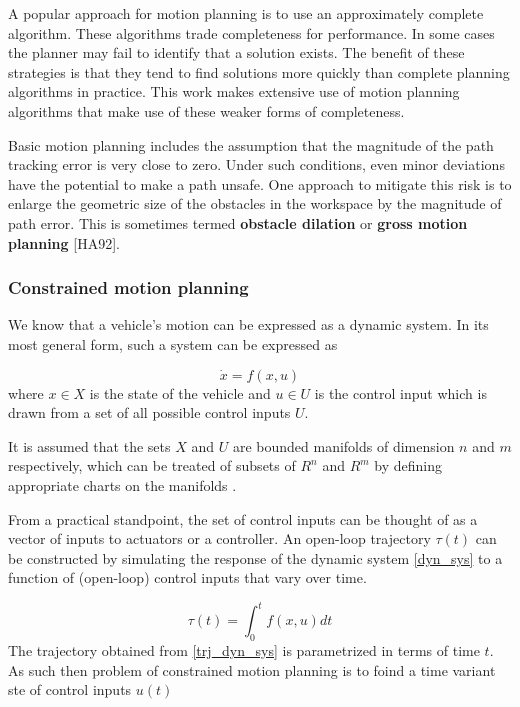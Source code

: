 A popular approach for motion planning is to use an approximately complete algorithm.
These algorithms trade completeness for performance. In some cases the planner may fail to
identify that a solution exists. The benefit of these strategies is that they tend to find solutions
more quickly than complete planning algorithms in practice. This work makes extensive use
of motion planning algorithms that make use of these weaker forms of completeness.

Basic motion planning includes the assumption that the magnitude of the path tracking
error is very close to zero. Under such conditions, even minor deviations have the potential to
make a path unsafe. One approach to mitigate this risk is to enlarge the geometric size of the
obstacles in the workspace by the magnitude of path error. This is sometimes termed \textbf{obstacle dilation} or \textbf{gross motion planning } [HA92].

\subsubsection{Constrained motion planning}

We know that a vehicle's motion can be expressed as a dynamic system. In its most general form, such a system can be expressed as

\begin{equation}
\dot{x} = f(x, u)
\label{dyn_sys}
\end{equation}
where $x\in X$ is the state of the vehicle and $u \in U$ is the control input which is drawn from a set of all possible control inputs $U$.


\begin{framed}
\theoremstyle{remark}
\begin{remark}{}
 
It is assumed that the sets $X$ and $U$ are bounded manifolds of dimension $n$ and $m$ respectively, which can be treated of
subsets of $R^n$ and $R^m$ by defining appropriate charts on the manifolds \cite{CLHKBKS2006}.
\end{remark}
\end{framed}

From a practical standpoint, the set of control inputs can be thought of as a vector of inputs to actuators or a controller.
An open-loop trajectory $\tau(t)$ can be constructed by simulating the response of the dynamic
system \ref{dyn_sys} to a function of (open-loop) control inputs that vary over time.

\begin{equation}
\tau(t) = \int_{0}^{t} f(x, u) dt
\label{trj_dyn_sys}
\end{equation}
The trajectory obtained from \ref{trj_dyn_sys} is parametrized in terms of time $t$. As such then problem of constrained motion planning is to foind  a time variant ste of
control inputs $u(t)$ 


